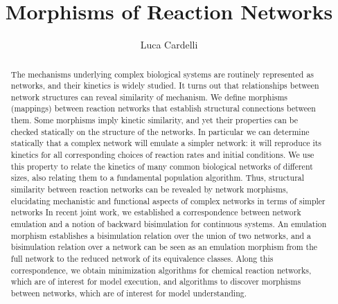 \documentclass{llncs}
\begin{document}



\title{\bf Morphisms of Reaction Networks}


\author{
 Luca Cardelli 
}


\maketitle

\begin{abstract}
 The mechanisms underlying complex biological systems are routinely represented as networks, and their kinetics is widely studied. It turns out that relationships between network structures can reveal similarity of mechanism. We define morphisms (mappings) between reaction networks that establish structural connections between them. Some morphisms imply kinetic similarity, and yet their properties can be checked statically on the structure of the networks. In particular we can determine statically that a complex network will emulate a simpler network: it will reproduce its kinetics for all corresponding choices of reaction rates and initial conditions. We use this property to relate the kinetics of many common biological networks of different sizes, also relating them to a fundamental population algorithm. Thus, structural similarity between reaction networks can be revealed by network morphisms, elucidating mechanistic and functional aspects of complex networks in terms of simpler networks In recent joint work, we established a correspondence between network emulation and a notion of backward bisimulation for continuous systems. An emulation morphism establishes a bisimulation relation over the union of two networks, and a bisimulation relation over a network can be seen as an emulation morphism from the full network to the reduced network of its equivalence classes. Along this correspondence, we obtain minimization algorithms for chemical reaction networks, which are of interest for model execution, and algorithms to discover morphisms between networks, which are of interest for model understanding. 
\end{abstract}



\end{document}
